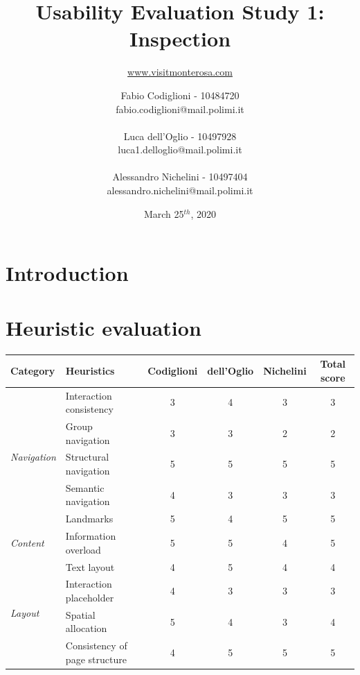 \documentclass[a4paper, 11pt, parskip=half, headsepline]{scrreprt}
\title{Usability Evaluation Study 1:\\ Inspection }
\subtitle{\href{https://www.visitmonterosa.com}{www.visitmonterosa.com}}
\author{Fabio Codiglioni - 10484720\\fabio.codiglioni@mail.polimi.it\\\\Luca dell'Oglio - 10497928\\luca1.delloglio@mail.polimi.it\\\\Alessandro Nichelini - 10497404\\alessandro.nichelini@mail.polimi.it}
\date{March 25$^{th}$, 2020}
\begin{document}
\maketitle
\tableofcontents
\newpage
{}


\chapter{Introduction}


\chapter{Heuristic evaluation}

\begin{center}
    \def\arraystretch{1.3}
    \begin{tabular}{|l|l|c|c|c|c|}
        \hline
        \textbf{Category} & \textbf{Heuristics} & \textbf{Codiglioni} & \textbf{dell'Oglio} & \textbf{Nichelini} & \textbf{Total score} \\ \hline
        \multirow{5}{*}{\textit{Navigation}} & Interaction consistency & 3 & 4 & 3 & 3 \\ \cline{2-6}
        & Group navigation & 3 & 3 & 2 & 2 \\ \cline{2-6}
        & Structural navigation & 5 & 5 & 5 & 5 \\ \cline{2-6}    %
        & Semantic navigation & 4 & 3 & 3 & 3 \\ \cline{2-6}
        & Landmarks & 5 & 4 & 5 & 5 \\ \hline
        \multirow{1}{*}{\textit{Content}} & Information overload & 5 & 5 & 4 & 5 \\ \hline
        \multirow{4}{*}{\textit{Layout}} & Text layout & 4 & 5 & 4 & 4 \\ \cline{2-6}
        & Interaction placeholder & 4 & 3 & 3 & 3 \\ \cline{2-6}
        & Spatial allocation & 5 & 4 & 3 & 4 \\ \cline{2-6}
        & Consistency of page structure & 4 & 5 & 5 & 5 \\ \hline
    \end{tabular}
\end{center}

\end{document}
